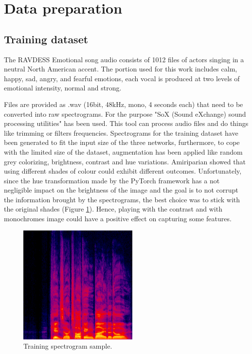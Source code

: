 \documentclass[10pt,twocolumn,letterpaper]{article}
\begin{document}
\section{Data preparation}\label{data-preparation}

\subsection{Training dataset}

The RAVDESS Emotional song audio consists of 1012 files of actors singing in a neutral North American accent. The portion used for this work includes calm, happy, sad, angry, and fearful emotions, each vocal is produced at two levels of emotional intensity, normal and strong.

Files are provided as .wav (16bit, 48kHz, mono, 4 seconds each) that need to be converted into raw spectrograms. For the purpose "SoX (Sound eXchange) sound processing utilities" has been used. This tool can process audio files and do things like trimming or filters frequencies. Spectrograms for the training dataset have been generated to fit the input size of the three networks, furthermore, to cope with the limited size of the dataset, augmentation has been applied like random grey colorizing, brightness, contrast and hue variations. Amiriparian \etal \cite{Amiriparian} showed that using different shades of colour could exhibit different outcomes. Unfortunately, since the hue transformation made by the PyTorch framework has a not negligible impact on the brightness of the image and the goal is to not corrupt the information brought by the spectrograms, the best choice was to stick with the original shades (Figure \ref{fig:training-sample}). Hence, playing with the contrast and with monochromes image could have a positive effect on capturing some features.

\begin{figure}[ht]
   \begin{center}
   \includegraphics[width=0.8\linewidth]{img/happy_92.png}
   \end{center}
      \caption{Training spectrogram sample.}
   \label{fig:training-sample}
   \end{figure}
\end{document}
